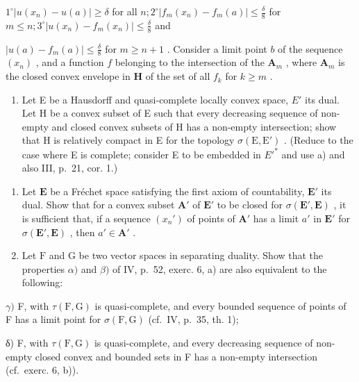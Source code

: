 \(1^{\circ}\left|u(x_{n}) - u(a)\right|\geqslant \delta\) for all \(n;2^{\circ}\left|f_{m}(x_{n}) - f_{m}(a)\right|\leqslant \frac{\delta}{8}\) for \(m\leqslant n;3^{\circ}\left|u(x_{n}) - f_{m}(x_{n})\right|\leqslant \frac{\delta}{8}\) and

\(\left|u(a) - f_m(a)\right| \leqslant \frac{\delta}{8}\) for \(m \geqslant n + 1\) . Consider a limit point \(b\) of the sequence \((x_n)\) , and a function \(f\) belonging to the intersection of the \(\mathbf{A}_m\) , where \(\mathbf{A}_m\) is the closed convex envelope in \(\mathbf{H}\) of the set of all \(f_k\) for \(k \geqslant m\) .

\begin{enumerate}
\def\labelenumi{\alph{enumi})}
\setcounter{enumi}{1}
\tightlist
\item
  Let E be a Hausdorff and quasi-complete locally convex space, \(E'\) its dual. Let H be a convex subset of E such that every decreasing sequence of non-empty and closed convex subsets of H has a non-empty intersection; show that H is relatively compact in E for the topology \(\sigma(\mathrm{E}, \mathrm{E}')\) . (Reduce to the case where E is complete; consider E to be embedded in \(E'^{*}\) and use a) and also III, p.~21, cor. 1.)
\end{enumerate}

\begin{enumerate}
\def\labelenumi{\arabic{enumi})}
\setcounter{enumi}{6}
\item
  Let \(\mathbf{E}\) be a Fréchet space satisfying the first axiom of countability, \(\mathbf{E}'\) its dual. Show that for a convex subset \(\mathbf{A}'\) of \(\mathbf{E}'\) to be closed for \(\sigma(\mathbf{E}', \mathbf{E})\) , it is sufficient that, if a sequence \((x_n')\) of points of \(\mathbf{A}'\) has a limit \(a'\) in \(\mathbf{E}'\) for \(\sigma(\mathbf{E}', \mathbf{E})\) , then \(a' \in \mathbf{A}'\) .
\item
  Let \(\mathrm{F}\) and \(\mathrm{G}\) be two vector spaces in separating duality. Show that the properties \(\alpha)\) and \(\beta)\) of IV, p.~52, exerc. 6, a) are also equivalent to the following:
\end{enumerate}

\(\gamma)\) F, with \(\tau (\mathrm{F},\mathrm{G})\) is quasi-complete, and every bounded sequence of points of F has a limit point for \(\sigma (\mathrm{F},\mathrm{G})\) (cf.~IV, p.~35, th. 1);

δ) F, with \(\tau(\mathrm{F},\mathrm{G})\) is quasi-complete, and every decreasing sequence of non-empty closed convex and bounded sets in F has a non-empty intersection (cf.~exerc. 6, b)).

